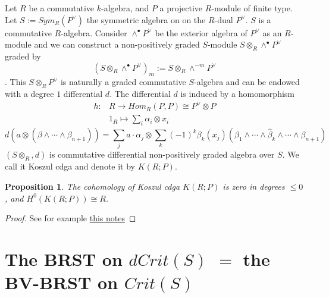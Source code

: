 \documentclass[11pt]{article}
\newtheorem{prop}[thm]{Proposition}
\newcommand{\lrta}{\longrightarrow}
\begin{document}
Let $R$ be a commutative $k$-algebra, and $P$ a projective $R$-module of finite type. Let $S:=Sym_R(P^\vee)$ the symmetric algebra on on the $R$-dual $P^\vee$. $S$ is a commutative $R$-algebra. Consider $\wedge^\bullet P^\vee$ be the exterior algebra of $P^\vee$ as an $R$-module and we can construct a non-positively graded $S$-module $S\otimes_R\wedge^\bullet P^\vee$ graded by 
$$
(S\otimes_R \wedge^\bullet P^\vee)_m:=S\otimes_R\wedge^{-m}P^\vee
$$
.
This $S\otimes_{R}P^\vee$ is naturally a graded commutative $S$-algebra and can be endowed with a degree $1$ differential $d$.
The differential $d$ is induced by a homomorphism
$$
\begin{aligned}
h:& R\lrta Hom_R(P,P)\cong P^\vee\otimes P\\
& 1_R\longmapsto \sum_i{\alpha_i}\otimes x_i
\end{aligned}
$$
$$
d(a\otimes(\beta\wedge\cdots\wedge \beta_{n+1}))=\sum_{j} a\cdot \alpha_{j}\otimes \sum_{k}(-1)^k\beta_k(x_j)(\beta_{1}\wedge\cdots \wedge \hat{\beta}_k\wedge \cdots \wedge \beta_{n+1})
$$
 $(S\otimes_R,d)$ is commutative differential non-positively graded algebra over $S$. We call it Koszul cdga and denote it by $K(R;P)$.
\begin{prop}
The cohomology of Koszul cdga $K(R;P)$  is zero in degrees $\leq 0$, and $H^0(K(R;P))\cong R$. 
\end{prop}
\begin{proof}
See for example \href{https://math.berkeley.edu/~ogus/Math_250B-2016/Notes/koszul.pdf}{this notes}
\end{proof}

\section{The BRST on $dCrit(S)$ $=$ the BV-BRST on $Crit(S)$}
\end{document}
